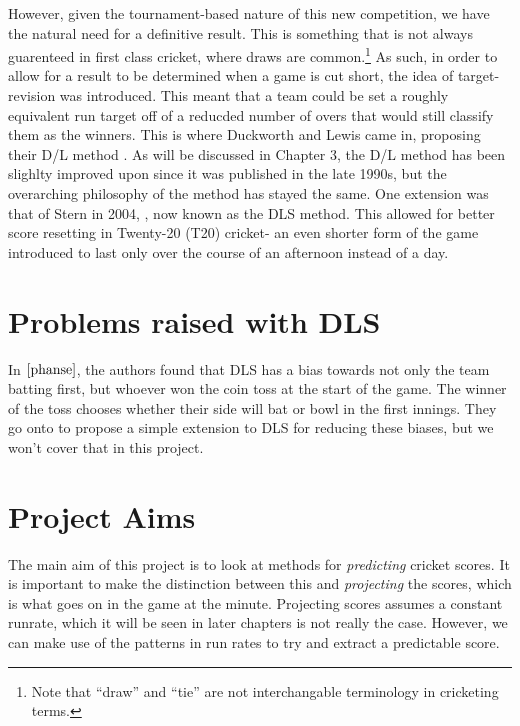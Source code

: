 However, given the tournament-based nature of this new competition, we have the natural need for a definitive result.
This is something that is not always guarenteed in first class cricket, where draws are common.\footnote{Note that 
``draw'' and ``tie'' are not interchangable terminology in cricketing terms.} As such, in order to allow for a result to be
determined when a game is cut short, the idea of target-revision was introduced. This meant that a team could be set a
roughly equivalent run target off of a reducded number of overs that would still classify them as the winners.
This is where Duckworth and Lewis came in, proposing their D/L method \cite{duckworth}. As will be discussed in Chapter 3, the D/L method 
has been slighlty improved upon since it was published in the late 1990s, but the overarching philosophy of the method has stayed the same. 
One extension was that of Stern in 2004, \cite{Stern}, now  known as the DLS method. This allowed for better score resetting in Twenty-20 (T20) cricket- an even shorter 
form of the game introduced to last only over the course of an afternoon instead of a day. 

\section{Problems raised with DLS}
In $\cite{phanse}$, the authors found that DLS has a bias towards not only the team batting first, but whoever won the coin toss at the start of the game.
The winner of the toss chooses whether their side will bat or bowl in the first innings. They go onto to propose a simple extension to DLS for reducing
these biases, but we won't cover that in this project. 

\section{Project Aims}
The main aim of this project is to look at methods for \textit{predicting} cricket scores. It is important to make the distinction between this 
and \textit{projecting} the scores, which is what goes on in the game at the minute. Projecting scores assumes a constant runrate, which it will be seen 
in later chapters is not really the case. However, we can make use of the patterns in run rates to try and extract a predictable score. 


